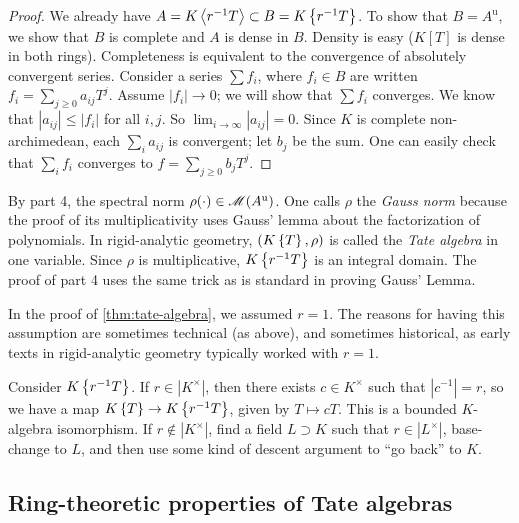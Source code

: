 \begin{proof}
We already have $A=K\left\langle r^{-1} T \right\rangle\subset B=K\left\{ r^{-1} T \right\}$. 
To show that $B=A^\mathrm{u}$, we show that $B$ is complete and $A$ is dense in 
$B$. Density is easy ($K[T]$ is dense in both rings). Completeness is 
equivalent to the convergence of absolutely convergent series. Consider a 
series $\sum f_i$, where $f_i\in B$ are written 
$f_i=\sum_{j\geqslant 0} a_{i j} T^j$. Assume $|f_i|\to 0$; we will show that 
$\sum f_i$ converges. We know that $|a_{i j}| \leqslant |f_i|$ for all $i,j$. 
So $\lim_{i\to \infty} |a_{i j}|=0$. Since $K$ is complete non-archimedean, 
each $\sum_i a_{i j}$ is convergent; let $b_j$ be the sum. One can easily 
check that $\sum_i f_i$ converges to $f=\sum_{j\geqslant 0} b_j T^j$. 
\end{proof}

By part 4, the spectral norm $\rho(\cdot)\in \operatorname{\mathscr{M}}(A^\mathrm{u})$. One 
calls $\rho$ the \emph{Gauss norm} because the proof of its multiplicativity 
uses Gauss' lemma about the factorization of polynomials. In rigid-analytic 
geometry, $(K\left\{ T \right\},\rho)$ is called the \emph{Tate algebra} in one 
variable. Since $\rho$ is multiplicative, $K\left\{ r^{-1} T \right\}$ is an 
integral domain. The proof of part 4 uses the same trick as is standard in 
proving Gauss' Lemma. 

In the proof of \autoref{thm:tate-algebra}, we assumed $r=1$. The reasons for 
having this assumption are sometimes technical (as above), and sometimes 
historical, as early texts in rigid-analytic geometry typically worked with 
$r=1$. 

Consider $K\left\{ r^{-1} T \right\}$. If $r\in |K^\times|$, then there exists 
$c\in K^\times$ such that $|c^{-1}|=r$, so we have a map 
$K\left\{ T \right\}\to K\left\{ r^{-1} T \right\}$, given by $T\mapsto c T$. This is a 
bounded $K$-algebra isomorphism. If $r\notin |K^\times|$, find a field 
$L\supset K$ such that $r\in |L^\times|$, base-change to $L$, and then use some 
kind of descent argument to ``go back'' to $K$. 





\subsection{Ring-theoretic properties of Tate algebras}

